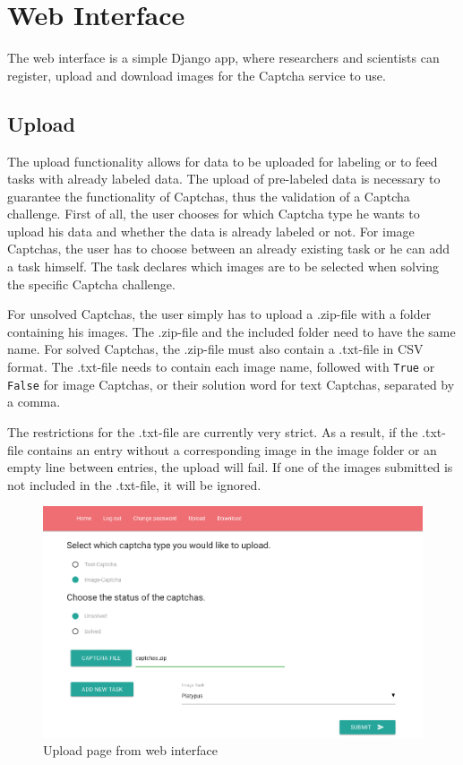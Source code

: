 \section{Web Interface}
\label{sec:web_interface}

The web interface is a simple Django app, where researchers and scientists can register, upload and download images for the Captcha service to use.

\subsection{Upload}

The upload functionality allows for data to be uploaded for labeling or to feed tasks with already labeled data. The upload of pre-labeled data is necessary to guarantee the functionality of Captchas, thus the validation of a Captcha challenge.
First of all, the user chooses for which Captcha type he wants to upload his data and whether the data is already labeled or not.
For image Captchas, the user has to choose between an already existing task or he can add a task himself. The task declares which images are to be selected when solving the specific Captcha challenge.

For unsolved Captchas, the user simply has to upload a .zip-file with a folder containing his images. The .zip-file and the included folder need to have the same name.
For solved Captchas, the .zip-file must also contain a .txt-file in CSV format. The .txt-file needs to contain each image name, followed with \verb|True| or \verb|False| for image Captchas, or their solution word for text Captchas, separated by a comma.

The restrictions for the .txt-file are currently very strict. As a result, if the .txt-file contains an entry without a corresponding image in the image folder or an empty line between entries, the upload will fail. If one of the images submitted is not included in the .txt-file, it will be ignored.
\begin{figure}[H]
\centering
\includegraphics[width=1\linewidth]{content/figures/upload.png}
\caption{Upload page from web interface}
\label{fig:upload}
\end{figure}

